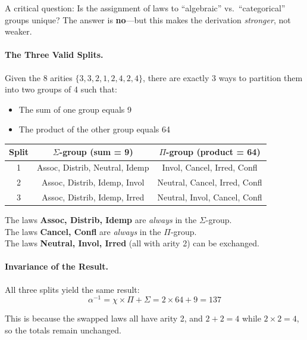 \documentclass[11pt,a4paper]{book}
\begin{document}
A critical question: Is the assignment of laws to ``algebraic'' vs.\ ``categorical''
groups unique? The answer is \textbf{no}—but this makes the derivation 
\emph{stronger}, not weaker.

\paragraph{The Three Valid Splits.}

Given the 8 arities $\{3, 3, 2, 1, 2, 4, 2, 4\}$, there are exactly 3 ways 
to partition them into two groups of 4 such that:
\begin{itemize}
\item The sum of one group equals 9
\item The product of the other group equals 64
\end{itemize}

\begin{center}
\begin{tabular}{ccc}
\textbf{Split} & $\Sigma$\textbf{-group (sum = 9)} & $\Pi$\textbf{-group (product = 64)} \\
\hline
1 & Assoc, Distrib, Neutral, Idemp & Invol, Cancel, Irred, Confl \\
2 & Assoc, Distrib, Idemp, Invol & Neutral, Cancel, Irred, Confl \\
3 & Assoc, Distrib, Idemp, Irred & Neutral, Invol, Cancel, Confl \\
\end{tabular}
\end{center}

The laws \textbf{Assoc, Distrib, Idemp} are \emph{always} in the $\Sigma$-group.\\
The laws \textbf{Cancel, Confl} are \emph{always} in the $\Pi$-group.\\
The laws \textbf{Neutral, Invol, Irred} (all with arity 2) can be exchanged.

\paragraph{Invariance of the Result.}

All three splits yield the same result:
$$\alpha^{-1} = \chi \times \Pi + \Sigma = 2 \times 64 + 9 = 137$$

This is because the swapped laws all have arity 2, and $2 + 2 = 4$ while 
$2 \times 2 = 4$, so the totals remain unchanged.
\end{document}
